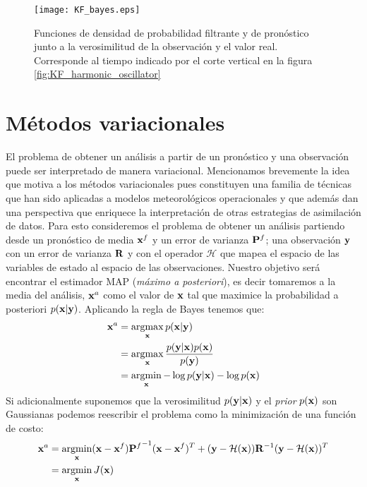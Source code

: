 \begin{figure}[h!]
    \centering
    \texttt{[image: KF\_bayes.eps]}
    \caption{Funciones de densidad de probabilidad filtrante y de pronóstico junto a la verosimilitud de la observación y el valor real. Corresponde al tiempo indicado por el corte vertical en la figura \ref{fig:KF_harmonic_oscillator}}
    \label{fig:KF_bayes}
\end{figure}

\section{Métodos variacionales}

El problema de obtener un análisis a partir de un pronóstico y una observación puede ser interpretado de manera variacional. Mencionamos brevemente la idea que motiva a los métodos variacionales pues constituyen una familia de técnicas que han sido aplicadas a modelos meteorológicos operacionales y que además dan una perspectiva que enriquece la interpretación de otras estrategias de asimilación de datos. Para esto consideremos el problema de obtener un análisis partiendo desde un pronóstico de media $\mathbf{x}^f$ y un error de varianza $\mathbf{P}^f$; una observación $\mathbf{y}$ con un error de varianza $\mathbf{R}$ y con el operador $\mathcal{H}$ que mapea el espacio de las variables de estado al espacio de las observaciones. Nuestro objetivo será encontrar el estimador MAP (\textit{máximo a posteriori}), es decir tomaremos a la media del análisis, $\mathbf{x}^a$ como el valor de $\mathbf{x}$ tal que maximice la probabilidad a posteriori $p(\mathbf{x} | \mathbf{y})$. Aplicando la regla de Bayes tenemos que:
\begin{align*}
    \mathbf{x}^a &= \operatorname*{argmax}\limits_{\mathbf{x}} p(\mathbf{x} | \mathbf{y}) \\
    &= \operatorname*{argmax}\limits_{\mathbf{x}} \frac{p(\mathbf{y} | \mathbf{x}) p(\mathbf{x})}{p(\mathbf{y})} \\
    &= \operatorname*{argmin}\limits_{\mathbf{x}} - \log p(\mathbf{y} | \mathbf{x}) - \log p(\mathbf{x})
\end{align*}
Si adicionalmente suponemos que la verosimilitud $p(\mathbf{y} | \mathbf{x})$ y el \textit{prior} $ p(\mathbf{x})$ son Gaussianas podemos reescribir el problema como la minimización de una función de costo:
\begin{align} \label{eq:3dvar_cost}
    \mathbf{x}^a &= \operatorname*{argmin}\limits_{\mathbf{x}} (\mathbf{x} - \mathbf{x}^f) {\mathbf{P}^f}^{-1} (\mathbf{x} - \mathbf{x}^f)^T + (\mathbf{y} - \mathcal{H} (\mathbf{x})) \mathbf{R}^{-1} (\mathbf{y} - \mathcal{H} (\mathbf{x}))^T \\
    &= \operatorname*{argmin}\limits_{\mathbf{x}} J(\mathbf{x})
\end{align}

